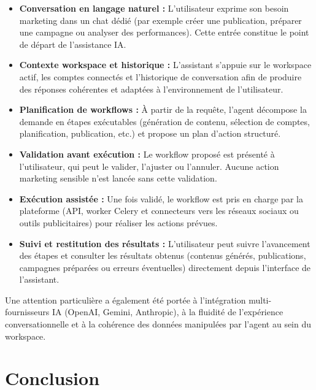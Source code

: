 \documentclass[12pt,a4paper]{report}
\numberwithin{figure}{chapter}
\numberwithin{table}{chapter}
\begin{document}
\begin{itemize}[leftmargin=2em,itemsep=6pt]

\item \textbf{Conversation en langage naturel :} L’utilisateur exprime son besoin marketing dans un chat dédié (par exemple créer une publication, préparer une campagne ou analyser des performances). Cette entrée constitue le point de départ de l’assistance IA.

\item \textbf{Contexte workspace et historique :} L’assistant s’appuie sur le workspace actif, les comptes connectés et l’historique de conversation afin de produire des réponses cohérentes et adaptées à l’environnement de l’utilisateur.

\item \textbf{Planification de workflows :} À partir de la requête, l’agent décompose la demande en étapes exécutables (génération de contenu, sélection de comptes, planification, publication, etc.) et propose un plan d’action structuré.

\item \textbf{Validation avant exécution :} Le workflow proposé est présenté à l’utilisateur, qui peut le valider, l’ajuster ou l’annuler. Aucune action marketing sensible n’est lancée sans cette validation.

\item \textbf{Exécution assistée :} Une fois validé, le workflow est pris en charge par la plateforme (API, worker Celery et connecteurs vers les réseaux sociaux ou outils publicitaires) pour réaliser les actions prévues.

\item \textbf{Suivi et restitution des résultats :} L’utilisateur peut suivre l’avancement des étapes et consulter les résultats obtenus (contenus générés, publications, campagnes préparées ou erreurs éventuelles) directement depuis l’interface de l’assistant.

\end{itemize}

Une attention particulière a également été portée à l’intégration multi-fournisseurs IA (OpenAI, Gemini, Anthropic), à la fluidité de l’expérience conversationnelle et à la cohérence des données manipulées par l’agent au sein du workspace.

\section{Conclusion}
\end{document}

